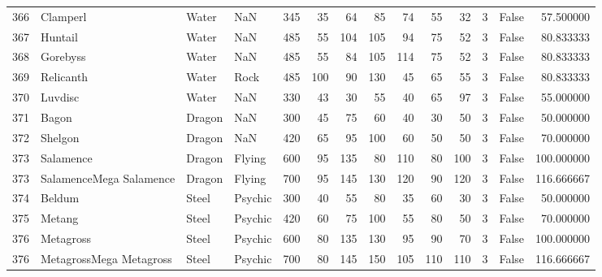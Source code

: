 \begin{tabular}{rlllrrrrrrrrlr}
 366 &                   Clamperl &     Water &       NaN &    345 &   35 &      64 &       85 &       74 &       55 &     32 &           3 &      False &   57.500000 \\
 367 &                    Huntail &     Water &       NaN &    485 &   55 &     104 &      105 &       94 &       75 &     52 &           3 &      False &   80.833333 \\
 368 &                   Gorebyss &     Water &       NaN &    485 &   55 &      84 &      105 &      114 &       75 &     52 &           3 &      False &   80.833333 \\
 369 &                  Relicanth &     Water &      Rock &    485 &  100 &      90 &      130 &       45 &       65 &     55 &           3 &      False &   80.833333 \\
 370 &                    Luvdisc &     Water &       NaN &    330 &   43 &      30 &       55 &       40 &       65 &     97 &           3 &      False &   55.000000 \\
 371 &                      Bagon &    Dragon &       NaN &    300 &   45 &      75 &       60 &       40 &       30 &     50 &           3 &      False &   50.000000 \\
 372 &                    Shelgon &    Dragon &       NaN &    420 &   65 &      95 &      100 &       60 &       50 &     50 &           3 &      False &   70.000000 \\
 373 &                  Salamence &    Dragon &    Flying &    600 &   95 &     135 &       80 &      110 &       80 &    100 &           3 &      False &  100.000000 \\
 373 &    SalamenceMega Salamence &    Dragon &    Flying &    700 &   95 &     145 &      130 &      120 &       90 &    120 &           3 &      False &  116.666667 \\
 374 &                     Beldum &     Steel &   Psychic &    300 &   40 &      55 &       80 &       35 &       60 &     30 &           3 &      False &   50.000000 \\
 375 &                     Metang &     Steel &   Psychic &    420 &   60 &      75 &      100 &       55 &       80 &     50 &           3 &      False &   70.000000 \\
 376 &                  Metagross &     Steel &   Psychic &    600 &   80 &     135 &      130 &       95 &       90 &     70 &           3 &      False &  100.000000 \\
 376 &    MetagrossMega Metagross &     Steel &   Psychic &    700 &   80 &     145 &      150 &      105 &      110 &    110 &           3 &      False &  116.666667 \\

\end{tabular}
